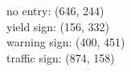 no entry: (646, 244) \\
yield sign: (156, 332) \\
warning sign: (400, 451) \\
traffic sign: (874, 158) \\
